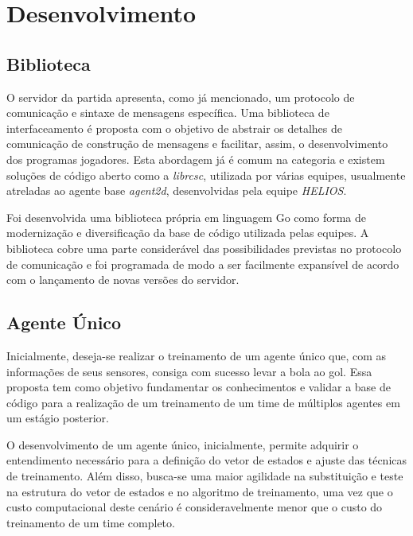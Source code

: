 \chapter{Desenvolvimento \label{chap:Desenvolvimento}}



\section{Biblioteca}

O servidor da partida apresenta, como já mencionado, um protocolo de comunicação e sintaxe de mensagens específica. Uma biblioteca de interfaceamento é proposta com o objetivo de abstrair os detalhes de comunicação de construção de mensagens e facilitar, assim, o desenvolvimento dos programas jogadores. Esta abordagem já é comum na categoria e existem soluções de código aberto como a \textit{librcsc}, utilizada por várias equipes, usualmente atreladas ao agente base \textit{agent2d}, desenvolvidas pela equipe \textit{HELIOS}.

Foi desenvolvida uma biblioteca própria em linguagem Go como forma de modernização e diversificação da base de código utilizada pelas equipes. A biblioteca cobre uma parte considerável das possibilidades previstas no protocolo de comunicação e foi programada de modo a ser facilmente expansível de acordo com o lançamento de novas versões do servidor.


\section{Agente Único}

Inicialmente, deseja-se realizar o treinamento de um agente único que, com as informações de seus sensores, consiga com sucesso levar a bola ao gol. Essa proposta tem como objetivo fundamentar os conhecimentos e validar a base de código para a realização de um treinamento de um time de múltiplos agentes em um estágio posterior.

O desenvolvimento de um agente único, inicialmente, permite adquirir o entendimento necessário para a definição do vetor de estados e ajuste das técnicas de treinamento. Além disso, busca-se uma maior agilidade na substituição e teste na estrutura do vetor de estados e no algoritmo de treinamento, uma vez que o custo computacional deste cenário é consideravelmente menor que o custo do treinamento de um time completo.

